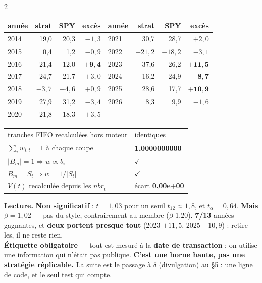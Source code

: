 \documentclass[9pt,a4paper]{extarticle}
\newcommand{\s}[2]{\vspace{1.0mm}{\color{bleu}\bfseries #1 $\cdot$ #2}\par\vspace{-0.3mm}}
\newcommand{\cadre}[3]{\begin{mdframed}[linecolor=#1!70,backgroundcolor=#1!5,linewidth=0.6pt,
 roundcorner=3pt,innertopmargin=3pt,innerbottommargin=3pt,innerleftmargin=4pt,innerrightmargin=4pt]
 {\scriptsize\textbf{#2} #3}\end{mdframed}}
\begin{document}
\begin{multicols}{2}
\vspace{-1mm}
\begin{center}\scriptsize
\begin{tabular}{@{}l r r r@{\qquad}l r r r@{}}
\toprule
année & strat & SPY & excès & année & strat & SPY & excès \\
\midrule
2014 & 19,0 & 20,3 & $-1{,}3$ & 2021 & 30,7 & 28,7 & $+2{,}0$ \\
2015 & \phantom{0}0,4 & \phantom{0}1,2 & $-0{,}9$ & 2022 & $-21{,}2$ & $-18{,}2$ & $-3{,}1$ \\
2016 & 21,4 & 12,0 & $\mathbf{+9{,}4}$ & 2023 & 37,6 & 26,2 & $\mathbf{+11{,}5}$ \\
2017 & 24,7 & 21,7 & $+3{,}0$ & 2024 & 16,2 & 24,9 & $\mathbf{-8{,}7}$ \\
2018 & $-3{,}7$ & $-4{,}6$ & $+0{,}9$ & 2025 & 28,6 & 17,7 & $\mathbf{+10{,}9}$ \\
2019 & 27,9 & 31,2 & $-3{,}4$ & 2026 & \phantom{0}8,3 & \phantom{0}9,9 & $-1{,}6$ \\
2020 & 21,8 & 18,3 & $+3{,}5$ & & & & \\
\bottomrule
\end{tabular}
\end{center}

\s{F}{Les validations}
\begin{center}\scriptsize
\begin{tabular}{@{}l l@{}}
\toprule
tranches FIFO recalculées hors moteur & identiques \\
$\sum_i w_{i,t} = 1$ à chaque coupe & \textbf{1,0000000000} \\
$|B_m| = 1 \Rightarrow w \propto b_i$ & $\checkmark$ \\
$B_m = S_t \Rightarrow w = 1/|S_t|$ & $\checkmark$ \\
$V(t)$ recalculée depuis les $nbr_i$ & écart \textbf{0,00e$+$00} \\
\bottomrule
\end{tabular}
\end{center}

\nopagebreak
\cadre{rouge}{Lecture.}{
\textbf{Non significatif} : $t = 1{,}03$ pour un seuil $t_{12} \approx 1{,}8$, et $t_\alpha = 0{,}64$.
\textbf{Mais $\beta = 1{,}02$} --- pas du style, contrairement au membre ($\beta$ 1,20).
\textbf{7/13} années gagnantes, et \textbf{deux portent presque tout} (2023 $+11{,}5$, 2025 $+10{,}9$) :
retire-les, il ne reste rien.\\[1mm]
\textbf{Étiquette obligatoire} --- tout est mesuré à la \textbf{date de transaction} : on utilise une information
qui n'était pas publique. \textbf{C'est une borne haute, pas une stratégie réplicable.}
La suite est le passage à $\delta$ (divulgation) au \S5 : une ligne de code, et le seul test qui compte.}

\end{multicols}
\end{document}
